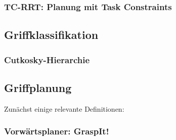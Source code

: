 \subsubsection*{TC-RRT: Planung mit Task Constraints}
\subsection{Griffklassifikation}
\subsubsection*{Cutkosky-Hierarchie}
\subsection{Griffplanung}
Zunächst einige relevante Definitionen:
\subsubsection*{Vorwärtsplaner: GraspIt!}